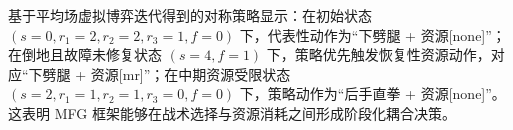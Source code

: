 基于平均场虚拟博弈迭代得到的对称策略显示：在初始状态 $(s=0,r_1=2,r_2=2,r_3=1,f=0)$ 下，代表性动作为“下劈腿 + 资源[none]”；在倒地且故障未修复状态 $(s=4,f=1)$ 下，策略优先触发恢复性资源动作，对应“下劈腿 + 资源[mr]”；在中期资源受限状态 $(s=2,r_1=1,r_2=1,r_3=0,f=0)$ 下，策略动作为“后手直拳 + 资源[none]”。
这表明 MFG 框架能够在战术选择与资源消耗之间形成阶段化耦合决策。
